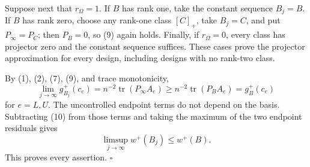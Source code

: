 Suppose next that \(r_\Omega=1\).  If \(B\) has rank one, take the constant sequence \(B_j=B\).  If \(B\) has rank zero, choose any rank-one class \([C]_+\), take \(B_j=C\), and put \(P_\infty=P_C\); then \(P_B=0\), so (9) again holds.  Finally, if \(r_\Omega=0\), every class has projector zero and the constant sequence suffices.  These cases prove the projector approximation for every design, including designs with no rank-two class.

By (1), (2), (7), (9), and trace monotonicity,
\[
\lim_{j\to\infty}g_{B_j}^+(c_e)
=n^{-2}\operatorname{tr}(P_\infty A_e)
\ge n^{-2}\operatorname{tr}(P_BA_e)
=g_B^+(c_e)
\tag{10}
\]
for \(e=L,U\).  The uncontrolled endpoint terms do not depend on the basis.  Subtracting (10) from those terms and taking the maximum of the two endpoint residuals gives
\[
\limsup_{j\to\infty}w^+(B_j)\le w^+(B).
\tag{11}
\]
This proves every assertion. \(\square\)